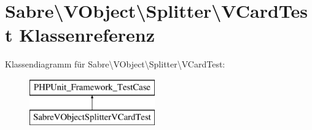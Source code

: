 \hypertarget{class_sabre_1_1_v_object_1_1_splitter_1_1_v_card_test}{}\section{Sabre\textbackslash{}V\+Object\textbackslash{}Splitter\textbackslash{}V\+Card\+Test Klassenreferenz}
\label{class_sabre_1_1_v_object_1_1_splitter_1_1_v_card_test}
Klassendiagramm für Sabre\textbackslash{}V\+Object\textbackslash{}Splitter\textbackslash{}V\+Card\+Test\+:\begin{figure}[H]
\begin{center}
\leavevmode
\includegraphics[height=2.000000cm]{class_sabre_1_1_v_object_1_1_splitter_1_1_v_card_test}
\end{center}
\end{figure}
